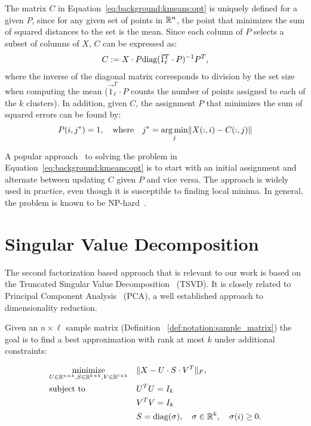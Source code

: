 The matrix $C$ in Equation~\ref{eq:background:kmeans:opt} is uniquely defined for a given $P$, since for any given set
of points in $\mathbb{R}^n$, the point that minimizes the sum of squared distances to the set is the mean. Since each
column of $P$ selects a subset of columns of $X$, $C$ can be expressed as:
\begin{equation}\label{eq:background:kmeans:centroids}
\begin{aligned}
 C := X\cdot P \textnormal{diag}(\vec{1}_\ell^T \cdot P)^{-1} P^T,
\end{aligned}
\end{equation}
where the inverse of the diagonal matrix corresponds to division by the set size when computing the mean ($\vec{1}_\ell^T \cdot P$ counts
the number of points assigned to each of the $k$ clusters). In addition, given $C$, the assignment $P$ that
minimizes the sum of squared errors can be found by:
\begin{equation}\label{eq:background:kmeans:assignments}
\begin{aligned}
P(i, j^*) = 1,\quad \textnormal{where}\quad j^* = \operatorname*{arg\,min}_j \lVert X(:,i) - C(:,j)\rVert
\end{aligned}
\end{equation}

A popular approach~\cite{kmeans} to solving the problem in Equation~\ref{eq:background:kmeans:opt} is to start with an initial assignment and alternate between updating $C$ given $P$ and vice
versa. The approach is widely used in practice, even though it is susceptible to finding local minima. In general, the problem is known to be NP-hard~\cite{aloise2009np}.

\section{Singular Value Decomposition}\label{chap:background:svd}

The second factorization based approach that is relevant to our work is based on the Truncated Singular Value Decomposition~\cite{golub} (TSVD). It is closely
related to Principal Component Analysis~\cite{Pearson1901On} (PCA), a well established approach to dimensionality reduction.

Given an $n \times \ell$ sample matrix (Definition ~\ref{def:notation:sample_matrix})
the goal is to find a best approximation with rank at most $k$ under additional constraints:

\begin{equation}\label{eq:background:svd:opt}
\begin{aligned}
& \underset{U \in \mathbb{R}^{n \times k}, S \in \mathbb{R}^{k \times k}, V \in \mathbb{R}^{\ell \times k}}{\text{minimize}}
& & \lVert X - U \cdot S \cdot V^T\rVert_F, \\
& \text{subject to}
& & U^TU = I_k \\
& & & V^TV = I_k \\
& & & S = \textnormal{diag}(\sigma), \quad \sigma \in \mathbb{R}^k, \quad \sigma(i) \geq 0.
\end{aligned}
\end{equation}

